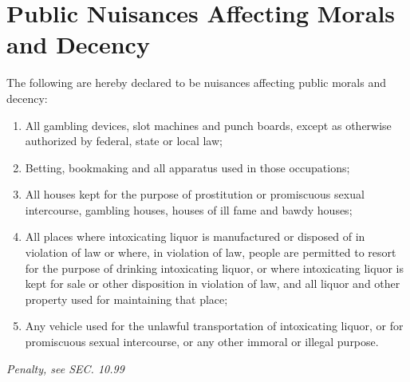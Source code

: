 \section{Public Nuisances Affecting Morals and Decency}
The following are hereby declared to be nuisances affecting public morals and decency:
\begin{enumerate}[{\indent}A)]
    \item All gambling devices, slot machines and punch boards, except as otherwise authorized by federal, state or local law;
    \item Betting, bookmaking and all apparatus used in those occupations;
    \item All houses kept for the purpose of prostitution or promiscuous sexual intercourse, gambling houses, houses of ill fame and bawdy houses;
    \item All places where intoxicating liquor is manufactured or disposed of in violation of law or where, in violation of law, people are permitted to resort for the purpose of drinking intoxicating liquor, or where intoxicating liquor is kept for sale or other disposition in violation of law, and all liquor and other property used for maintaining that place;
    \item Any vehicle used for the unlawful transportation of intoxicating liquor, or for promiscuous sexual intercourse, or any other immoral or illegal purpose.
\end{enumerate}
\emph{Penalty, see SEC. 10.99}
